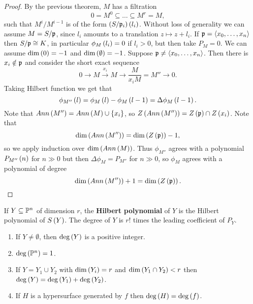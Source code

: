 \begin{proof}
By the previous theorem, $ M $ has a filtration
$$ 0 = M^0 \subseteq \dots \subseteq M^r = M, $$
such that $ M^i / M^{i - 1} $ is of the form $ \rb{S / \pp_i}\rb{l_i} $. Without loss of generality we can assume $ M = S / \pp $, since $ l_i $ amounts to a translation $ z \mapsto z + l_i $. If $ \pp = \ab{x_0, \dots, x_n} $ then $ S / \pp \cong K $, in particular $ \phi_M\rb{l_i} = 0 $ if $ l_i > 0 $, but then take $ P_M = 0 $. We can assume $ \dim\rb{0} = -1 $ and $ \dim\rb{\emptyset} = -1 $. Suppose $ \pp \ne \ab{x_0, \dots, x_n} $. Then there is $ x_i \notin \pp $ and consider the short exact sequence
$$ 0 \to M \xrightarrow{x_i} M \to \dfrac{M}{x_iM} = M'' \to 0. $$
Taking Hilbert function we get that
$$ \phi_{M''}\rb{l} = \phi_M\rb{l} - \phi_M\rb{l - 1} = \Delta\phi_M\rb{l - 1}. $$
Note that $ Ann\rb{M''} = Ann\rb{M} \cup \cb{x_i} $, so $ Z\rb{Ann\rb{M''}} = Z\rb{\pp} \cap Z\rb{x_i} $. Note that
$$ \dim\rb{Ann\rb{M''}} = \dim\rb{Z\rb{\pp}} - 1, $$
so we apply induction over $ \dim\rb{Ann\rb{M}} $. Thus $ \phi_{M''} $ agrees with a polynomial $ P_{M''}\rb{n} $ for $ n \gg 0 $ but then $ \Delta\phi_M = P_{M''} $ for $ n \gg 0 $, so $ \phi_M $ agrees with a polynomial of degree
$$ \dim\rb{Ann\rb{M''}} + 1 = \dim\rb{Z\rb{\pp}}. $$
\end{proof}

\begin{definition}
If $ Y \subseteq \P^n $ of dimension $ r $, the \textbf{Hilbert polynomial} of $ Y $ is the Hilbert polynomial of $ S\rb{Y} $. The degree of $ Y $ is $ r! $ times the leading coefficient of $ P_Y $.
\end{definition}

\begin{theorem}
\hfill
\begin{enumerate}
\item If $ Y \ne \emptyset $, then $ \deg\rb{Y} $ is a positive integer.
\item $ \deg\rb{\P^n} = 1 $.
\item If $ Y = Y_1 \cup Y_2 $ with $ \dim\rb{Y_i} = r $ and $ \dim\rb{Y_1 \cap Y_2} < r $ then $ \deg\rb{Y} = \deg\rb{Y_1} + \deg\rb{Y_2} $.
\item If $ H $ is a hypersurface generated by $ f $ then $ \deg\rb{H} = \deg\rb{f} $.
\end{enumerate}
\end{theorem}

